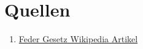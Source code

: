 \documentclass[../main.tex]{subfiles} %
\begin{document}
\chapter{Quellen}\label{ch:quellen}
    \begin{enumerate}
        \item \href{https://de.wikipedia.org/wiki/Hookesches_Gesetz}{Feder Gesetz Wikipedia Artikel}
    \end{enumerate}
\end{document}
